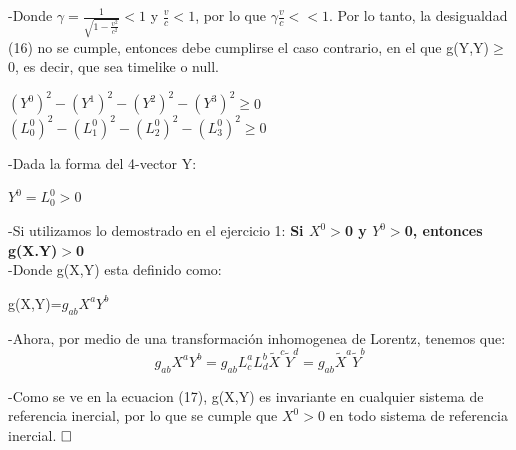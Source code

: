 \documentclass[a4paper, 11pt]{article}
\begin{document}
-Donde $\gamma=\frac{1}{\sqrt{1-\frac{v^2}{c^2}}}<1$ y $\frac{v}{c}<1$, por lo que $\gamma\frac{v}{c}<<1$. Por lo tanto, la desigualdad (16) no se cumple, entonces debe cumplirse el caso contrario, en el que g(Y,Y)$\geq$0, es decir, que sea timelike o null.
\begin{center}
    $(Y^{0})^2-(Y^{1})^2-(Y^{2})^2-(Y^{3})^2\geq$0\\
    $(L_{0}^{0})^2-(L_{1}^{0})^2-(L_{2}^{0})^2-(L_{3}^{0})^2\geq$0
\end{center}

-Dada la forma del 4-vector Y:
\begin{center}
    $Y^{0}=L_{0}^{0}>$0
\end{center}

-Si utilizamos lo demostrado en el ejercicio 1: \textbf{Si $X^{0}>$0 y $Y^{0}>$0, entonces g(X.Y)$>$0}\\

-Donde g(X,Y) esta definido como:
\begin{center}
    g(X,Y)=$g_{ab}X^{a}Y^{b}$
\end{center}

-Ahora, por medio de una transformación inhomogenea de Lorentz, tenemos que:
\begin{equation}
    g_{ab}X^{a}Y^{b}=g_{ab}L_{c}^{a}L_{d}^{b}\tilde{X}^{c}\tilde{Y}^{d}=g_{ab}\tilde{X}^{a}\tilde{Y}^{b}
\end{equation}

-Como se ve en la ecuacion (17), g(X,Y) es invariante en cualquier sistema de referencia inercial, por lo que se cumple que $X^{0}>$0 en todo sistema de referencia inercial.
$\hfill\square$

\newpage
\end{document}
